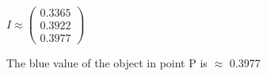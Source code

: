 $
    I
\approx
    \left(\begin{array}{c}
        0.3365\\
        0.3922\\
        0.3977
    \end{array}\right)
$

The blue value of the object in point P is $\approx$ 0.3977